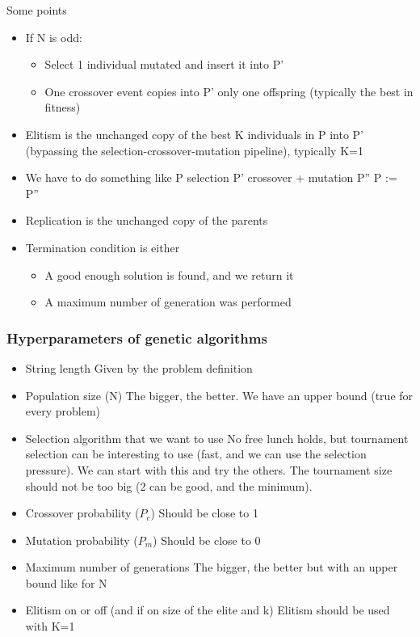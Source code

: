 Some points

\begin{itemize}
    \item If N is odd:
    \begin{itemize}
        \item Select 1 individual mutated and insert it into P'
        \item One crossover event copies into P' only one offspring (typically the best in fitness)
    \end{itemize}
    \item Elitism is the unchanged copy of the best K individuals in P into P' (bypassing the selection-crossover-mutation pipeline), typically K=1
    \item We have to do something like P \ra selection \ra P' \ra crossover + mutation \ra P'' \ra P := P'' 
    \item Replication is the unchanged copy of the parents
    \item Termination condition is either
    \begin{itemize}
        \item A good enough solution is found, and we return it
        \item A maximum number of generation was performed
    \end{itemize}
\end{itemize}


\subsubsection{Hyperparameters of genetic algorithms}

\begin{itemize}
    \item String length \ra Given by the problem definition
    \item Population size (N) \ra The bigger, the better. We have an upper bound (true for every problem)
    \item Selection algorithm that we want to use \ra No free lunch holds, but tournament selection can be interesting to use (fast, and we can use the selection pressure). We can start with this and try the others. The tournament size should not be too big (2 can be good, and the minimum). 
    \item Crossover probability ($P_c$) \ra Should be close to 1
    \item Mutation probability ($P_m$) \ra Should be close to 0
    \item Maximum number of generations \ra The bigger, the better but with an upper bound like for N
    \item Elitism on or off  (and if on size of the elite and k) \ra Elitism should be used with K=1
\end{itemize}




